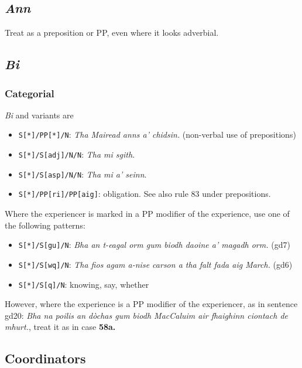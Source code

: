 \documentclass[a4paper]{article}
\begin{document}
\subsection{\textit{Ann}}

 Treat as a preposition or PP, even where it looks adverbial.

\subsection{\textit{Bi}\label{subsect:bi}}



\subsubsection*{Categorial}

 \textit{Bi} and variants are \begin{itemize}
\item \texttt{S[*]/PP[*]/N}: \textit{Tha Mairead anns a' chidsin.} (non-verbal use of prepositions)
\item \texttt{S[*]/S[adj]/N/N}: \textit{Tha mi sgith}.
\item \texttt{S[*]/S[asp]/N/N}: \textit{Tha mi a' seinn}.
\item \texttt{S[*]/PP[ri]/PP[aig]}: obligation. See also rule 83 under prepositions.
\end{itemize}

Where the experiencer is marked in a PP modifier of the experience, use one of the following patterns:
\begin{itemize}
\item \texttt{S[*]/S[gu]/N}: \textit{Bha an t-eagal orm gum biodh daoine a' magadh orm.} (gd7)
\item \texttt{S[*]/S[wq]/N}: \textit{Tha fios agam a-nise carson a tha falt fada aig March.} (gd6)
\item \texttt{S[*]/S[q]/N}: knowing, say, whether
\end{itemize}

However, where the experience is a PP modifier of the experiencer, as in sentence gd20: \textit{Bha na poilis an d\`ochas gum biodh MacCaluim air fhaighinn ciontach de mhurt.}, treat it as in case \bf 58a\rm.



\subsection{Coordinators\label{subsect:coordinators}}
\end{document}
